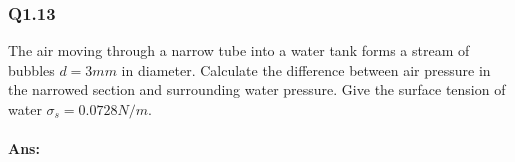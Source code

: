 \subsubsection{Q1.13}
The air moving through a narrow tube into a water tank forms a stream of bubbles $ d=3\unit{mm} $ in diameter. Calculate the difference between air pressure in the narrowed section and surrounding water pressure. Give the surface tension of water $ \sigma_s = 0.0728\unit{N/m} $.
\paragraph{Ans:}$ $

